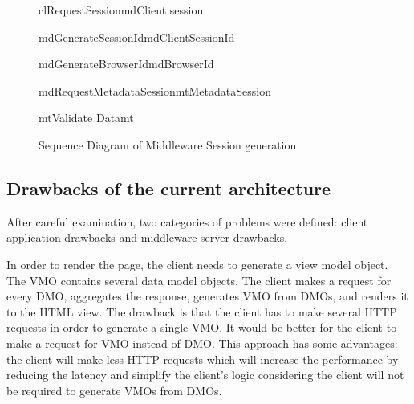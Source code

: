 \begin{figure}[h]
\begin{center}

	\resizebox{1.1\textwidth}{0.5\textwidth} {

	\begin{sequencediagram}

	\begin{call}{cl}{RequestSession}{md}{Client session}

		\begin{call}{md}{GenerateSessionId}{md}{ClientSessionId} \end{call}
		\begin{call}{md}{GenerateBrowserId}{md}{BrowserId} \end{call}
		\begin{call}{md}{RequestMetadataSession}{mt}{MetadataSession} 
			\begin{call}{mt}{Validate Data}{mt}{}\end{call}
		\end{call}

	\end{call}

	\end{sequencediagram}
	}

\end{center}
\caption{Sequence Diagram of Middleware Session generation}
\label{fig:arch_sess_uml}
\end{figure}


\subsection{Drawbacks of the current architecture}

After careful examination, two categories of problems were defined: client application drawbacks and middleware server drawbacks. 

In order to render the page, the client needs to generate a view model object. The VMO contains several data model objects. The client makes a request for every DMO, aggregates the response, generates VMO from DMOs, and renders it to the HTML view. The drawback is that the client has to make several HTTP requests in order to generate a single VMO. It would be better for the client to make a request for VMO instead of DMO. This approach has some advantages: the client will make less HTTP requests which will increase the performance by reducing the latency and simplify the client's logic considering the client will not be required to generate VMOs from DMOs. 

